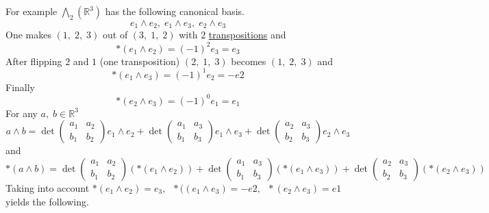 \documentclass[color=black,11pt]{elegantpaper}
\begin{document}
For example ${\bigwedge}_2 (\mathbb{R}^3)$ has the following canonical basis.
$$
e_1 \wedge e_2,\;e_1 \wedge e_3,\; e_2\wedge e_3
$$
One makes $(1,\;2,\;3)$ out of $(3,\;1,\;2)$ with $2$ \href{https://en.wikipedia.org/wiki/Cyclic_permutation#Transpositions}{transpositions} and
$$
\ast(e_1 \wedge e_2) = (-1)^2 e_3 = e_3
$$
After flipping $2$ and $1$ (one transposition) $(2,\;1,\;3)$ becomes $(1,\;2,\;3) $ and
$$
\ast(e_1 \wedge e_3) = (-1)^1 e_2 = -e2
$$
Finally
$$
\ast(e_2 \wedge e_3) = (-1)^0 e_1 = e_1
$$
For any $a,\;b \in \mathbb{R}^3$
$$
a\wedge b =  \det\left( \begin{array}{cc}
                                       a_1 & a_2 \\
                                       b_1 & b_2
                                   \end{array}\right) e_1\wedge e_2 +
             \det\left( \begin{array}{cc}
                                       a_1 & a_3 \\
                                       b_1 & b_3
                                   \end{array}\right) e_1 \wedge e_3 +
             \det\left( \begin{array}{cc}
                                       a_2 & a_3 \\
                                       b_2 & b_3
                                   \end{array}\right) e_2 \wedge e_3
$$
and
$$
\ast(a \wedge b) = \det\left( \begin{array}{cc}
                                       a_1 & a_2 \\
                                       b_1 & b_2
                                   \end{array}\right)(\ast ( e_1\wedge e_2)) +
             \det\left( \begin{array}{cc}
                                       a_1 & a_3 \\
                                       b_1 & b_3
                                   \end{array}\right)(\ast ( e_1 \wedge e_3)) +
             \det\left( \begin{array}{cc}
                                       a_2 & a_3 \\
                                       b_2 & b_3
                                   \end{array}\right)(\ast (e_2 \wedge e_3))
$$
Taking into account $\ast(e_1\wedge e_2)=e_3,\;\;\ast(( e_1 \wedge e_3)=-e2,\;\;\ast (e_2 \wedge e_3)=e1$ yields the following.
\end{document}
